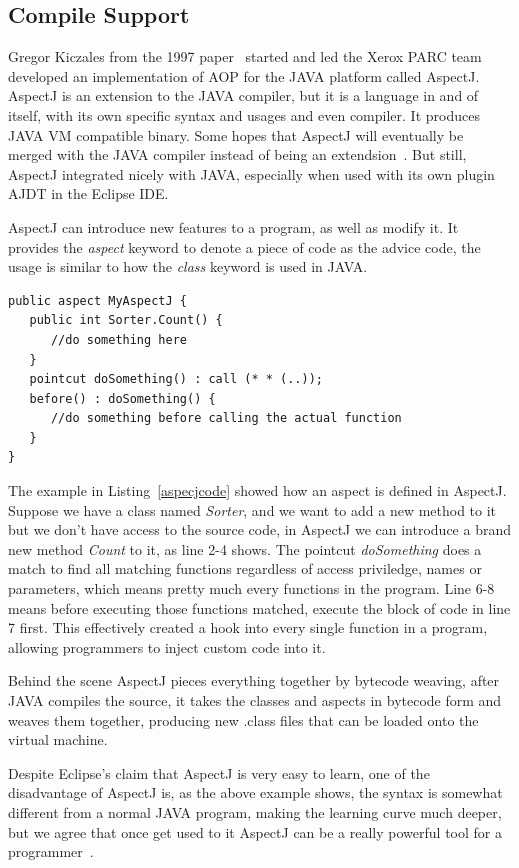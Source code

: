 \subsection{Compile Support}

Gregor Kiczales from the 1997 paper~\cite{aop} started and led the Xerox PARC team developed an implementation of AOP for the JAVA platform called AspectJ. AspectJ is an extension to the JAVA compiler, but it is a language in and of itself, with its own specific syntax and usages and even compiler. It produces JAVA VM compatible binary. Some hopes that AspectJ will eventually be merged with the JAVA compiler instead of being an extendsion~\cite{aspectj_faq}. But still, AspectJ integrated nicely with JAVA, especially when used with its own plugin AJDT in the Eclipse IDE.

AspectJ can introduce new features to a program, as well as modify it. It provides the {\em aspect} keyword to denote a piece of code as the advice code, the usage is similar to how the {\em class} keyword is used in JAVA.

\begin{lstlisting}[caption={sample aspectj code}, label=aspecjcode]
public aspect MyAspectJ {
   public int Sorter.Count() {
      //do something here
   }
   pointcut doSomething() : call (* * (..));
   before() : doSomething() {
      //do something before calling the actual function
   }
}
\end{lstlisting}

The example in Listing~\ref{aspecjcode} showed how an aspect is defined in AspectJ. Suppose we have a class named {\em Sorter}, and we want to add a new method to it but we don't have access to the source code, in AspectJ we can introduce a brand new method {\em Count} to it, as line 2-4 shows. The pointcut {\em doSomething} does a match to find all matching functions regardless of access priviledge, names or parameters, which means pretty much every functions in the program. Line 6-8 means before executing those functions matched, execute the block of code in line 7 first. This effectively created a hook into every single function in a program, allowing programmers to inject custom code into it.

Behind the scene AspectJ pieces everything together by bytecode weaving, after JAVA compiles the source, it takes the classes and aspects in bytecode form and weaves them together, producing new .class files that can be loaded onto the virtual machine.

Despite Eclipse's claim that AspectJ is very easy to learn, one of the disadvantage of AspectJ is, as the above example shows, the syntax is somewhat different from a normal JAVA program, making the learning curve much deeper, but we agree that once get used to it AspectJ can be a really powerful tool for a programmer~\cite{aspectj_text}.

